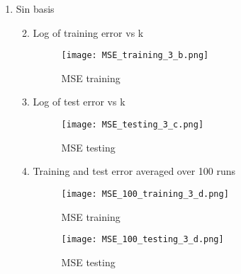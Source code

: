 \documentclass{article}
\begin{document}
\begin{enumerate}
  \item Sin basis
    \begin{enumerate}[label=\alph*.]
  \setcounter{enumii}{1} %
      \item Log of training error vs k
            \begin{figure}[H]
                \centering
                \texttt{[image: MSE\_training\_3\_b.png]}
                \caption{\label{fig:MSE_training_3_b}MSE training}
            \end{figure}
      \item Log of test error vs k
            \begin{figure}[H]
                \centering
                \texttt{[image: MSE\_testing\_3\_c.png]}
                \caption{\label{fig:MSE_testing_3_c}MSE testing}
            \end{figure}
      \item Training and test error averaged over 100 runs
        \begin{figure}[ht]
          \centering
          \begin{minipage}[b]{0.45\textwidth}
            \texttt{[image: MSE\_100\_training\_3\_d.png]}
            \caption{\label{fig:MSE_100_training_3_d}MSE training}
          \end{minipage}
          \begin{minipage}[b]{0.45\textwidth}
            \texttt{[image: MSE\_100\_testing\_3\_d.png]}
            \caption{\label{fig:MSE_100_testing_3_d}MSE testing}
          \end{minipage}
        \end{figure}
    \end{enumerate}
\end{enumerate}
\end{document}

